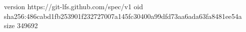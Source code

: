 version https://git-lfs.github.com/spec/v1
oid sha256:486cabd1fb253901f232727007a145fc30400a99dfd73aa6ada63fa8481ee54a
size 349692
